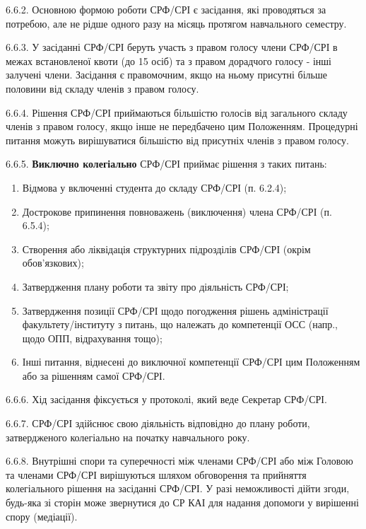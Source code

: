     6.6.2. Основною формою роботи СРФ/СРІ є засідання, які проводяться за потребою, але не рідше одного разу на місяць протягом навчального семестру.

    6.6.3. У засіданні СРФ/СРІ беруть участь з правом голосу члени СРФ/СРІ в межах встановленої квоти (до 15 осіб) та з правом дорадчого голосу - інші залучені члени. Засідання є правомочним, якщо на ньому присутні більше половини від складу членів з правом голосу.

    6.6.4. Рішення СРФ/СРІ приймаються більшістю голосів від загального складу членів з правом голосу, якщо інше не передбачено цим Положенням. Процедурні питання можуть вирішуватися більшістю від присутніх членів з правом голосу.

    6.6.5. \textbf{Виключно колегіально} СРФ/СРІ приймає рішення з таких питань:

        \begin{enumerate}[label=\alph*)]
            \item Відмова у включенні студента до складу СРФ/СРІ (п. 6.2.4);

            \item Дострокове припинення повноважень (виключення) члена СРФ/СРІ (п. 6.5.4);

            \item Створення або ліквідація структурних підрозділів СРФ/СРІ (окрім обов'язкових);
            \item Затвердження плану роботи та звіту про діяльність СРФ/СРІ;
            \item Затвердження позиції СРФ/СРІ щодо погодження рішень адміністрації факультету/інституту з питань, що належать до компетенції ОСС (напр., щодо ОПП, відрахування тощо);
            \item Інші питання, віднесені до виключної компетенції СРФ/СРІ цим Положенням або за рішенням самої СРФ/СРІ.
        \end{enumerate}

    6.6.6. Хід засідання фіксується у протоколі, який веде Секретар СРФ/СРІ.

    6.6.7. СРФ/СРІ здійснює свою діяльність відповідно до плану роботи, затвердженого колегіально на початку навчального року.

    6.6.8. Внутрішні спори та суперечності між членами СРФ/СРІ або між Головою та членами СРФ/СРІ вирішуються шляхом обговорення та прийняття колегіального рішення на засіданні СРФ/СРІ. У разі неможливості дійти згоди, будь-яка зі сторін може звернутися до СР КАІ для надання допомоги у вирішенні спору (медіації).

